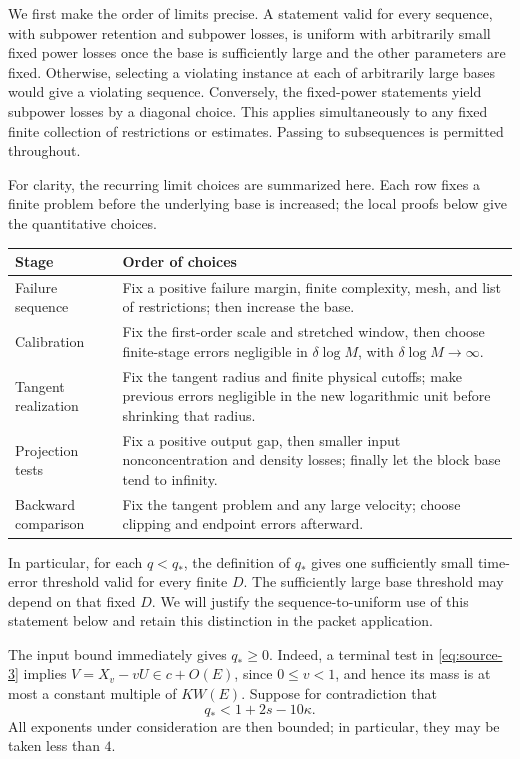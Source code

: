 We first make the order of limits precise.  A statement valid for
every sequence, with subpower retention and subpower losses, is
uniform with arbitrarily small fixed power losses once the base
is sufficiently large and the other parameters are fixed.
Otherwise, selecting a violating instance at each of arbitrarily
large bases would give a violating sequence.  Conversely, the
fixed-power statements yield subpower losses by a diagonal choice.
This applies simultaneously to any fixed finite collection of
restrictions or estimates.  Passing to subsequences is permitted
throughout.

For clarity, the recurring limit choices are summarized here.  Each
row fixes a finite problem before the underlying base is increased;
the local proofs below give the quantitative choices.
\begin{center}
\small
\begin{tabular}{@{}p{.23\linewidth}p{.72\linewidth}@{}}
\toprule
Stage & Order of choices \\
\midrule
Failure sequence & Fix a positive failure margin, finite complexity,
mesh, and list of restrictions; then increase the base. \\
Calibration & Fix the first-order scale and stretched window, then
choose finite-stage errors negligible in \(\delta\log M\), with
\(\delta\log M\to\infty\). \\
Tangent realization & Fix the tangent radius and finite physical
cutoffs; make previous errors negligible in the new logarithmic unit
before shrinking that radius. \\
Projection tests & Fix a positive output gap, then smaller input
nonconcentration and density losses; finally let the block base tend
to infinity. \\
Backward comparison & Fix the tangent problem and any large velocity;
choose clipping and endpoint errors afterward. \\
\bottomrule
\end{tabular}
\end{center}
In particular, for each \(q<q_*\), the definition of \(q_*\) gives
one sufficiently small time-error threshold valid for every finite
\(D\).  The sufficiently large base threshold may depend on that
fixed \(D\).  We will justify the sequence-to-uniform use of this
statement below and retain this distinction in the packet application.

The input bound immediately gives \(q_*\ge0\).  Indeed, a terminal
test in \eqref{eq:source-3} implies
\(V=X_v-vU\in c+O(E)\), since \(0\le v<1\), and hence its mass is
at most a constant multiple of \(KW(E)\).
Suppose for contradiction that
\[
q_*<1+2s-10\kappa.
\]
All exponents under consideration are then bounded; in particular,
they may be taken less than \(4\).

